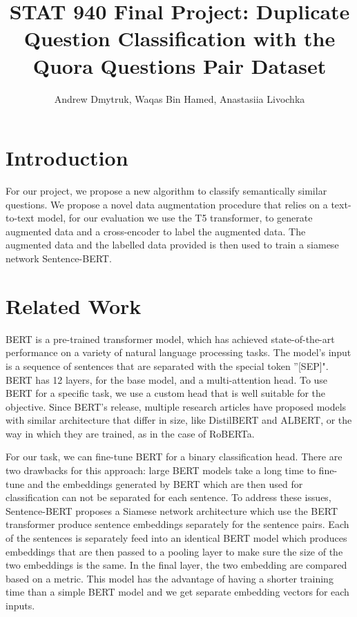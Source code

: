 \documentclass[11pt, oneside]{article}   	%
\title{STAT 940 Final Project: Duplicate Question Classification with the Quora Questions Pair Dataset}
\author{Andrew Dmytruk, Waqas Bin Hamed, Anastasiia Livochka}
\begin{document}
\maketitle

\newpage
\section{Introduction}

For our project, we propose a new algorithm to classify semantically similar questions. We propose a novel data augmentation procedure that relies on a text-to-text model, for our evaluation we use the T5 transformer, to generate augmented data and a cross-encoder to label the augmented data. The augmented data and the labelled data provided is then used to train a siamese network Sentence-BERT. 


\section{Related Work}

BERT is a pre-trained transformer model, which has achieved state-of-the-art performance on a variety of natural language processing tasks. The model's input is a sequence of sentences that are separated with the special token ''[SEP]". BERT has 12 layers, for the base model, and a multi-attention head. To use BERT for a specific task, we use a custom head that is well suitable for the objective. Since BERT's release, multiple research articles have proposed models with similar architecture that differ in size, like DistilBERT and ALBERT, or the way in which they are trained, as in the case of RoBERTa.

For our task, we can fine-tune BERT for a binary classification head. There are two drawbacks for this approach: large BERT models take a long time to fine-tune and the embeddings generated by BERT which are then used for classification can not be separated for each sentence. To address these issues, Sentence-BERT proposes a Siamese network architecture which use the BERT transformer produce sentence embeddings separately for the sentence pairs. Each of the sentences is separately feed into an identical BERT model which produces embeddings that are then passed to a pooling layer to make sure the size of the two embeddings is the same. In the final layer, the two embedding are compared based on a metric. This model has the advantage of having a shorter training time than a simple BERT model and we get separate embedding vectors for each inputs. 
\end{document}
